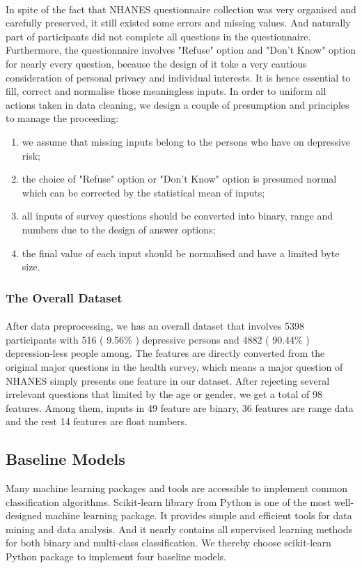 \documentclass[runningheads]{llncs}
\begin{document}
\paragraph{}
In spite of the fact that NHANES questionnaire collection was very organised and carefully preserved, it still existed some errors and missing values. And naturally part of participants did not complete all questions in the questionnaire. Furthermore,  the questionnaire involves "Refuse" option and "Don't Know" option for nearly every question, because the design of it toke a very cautious consideration of personal privacy and individual interests. It is hence essential to fill, correct and normalise those meaningless inputs. In order to uniform all actions taken in data cleaning, we design a couple of presumption and principles to manage the proceeding:
\begin{enumerate}[label=\alph*)]
	\item	  we assume that missing inputs belong to the persons who have on depressive risk;
	\item   the choice of "Refuse" option or "Don't Know" option is presumed normal which can be corrected by the statistical mean of inputs;
	\item	  all inputs of survey questions should be converted into binary, range and numbers due to the design of answer options;
	\item	  the final value of each input should be normalised and have a limited byte size.
\end{enumerate}
%
%
\subsubsection{The Overall Dataset}
\paragraph{}
After data preprocessing, we has an overall dataset that involves 5398 participants with 516 ( 9.56\% ) depressive persons and 4882 ( 90.44\% ) depression-less people among. The features are directly converted from the original major questions in the health survey, which means a major question of NHANES simply presents one feature in our dataset. After rejecting several irrelevant questions that limited by the age or gender, we get a total of 98 features. Among them, inputs in 49 feature are binary, 36 features are range data and the rest 14 features are float numbers. 
%
%
\subsection{Baseline Models}
%
Many machine learning packages and tools are accessible to implement common classification algorithms. Scikit-learn library from Python is one of the most well-designed machine learning package. It provides simple and efficient tools for data mining and data analysis. And it nearly contains all supervised learning methods for both binary and multi-class classification. We thereby choose scikit-learn Python package to implement four baseline models.
%
\end{document}
